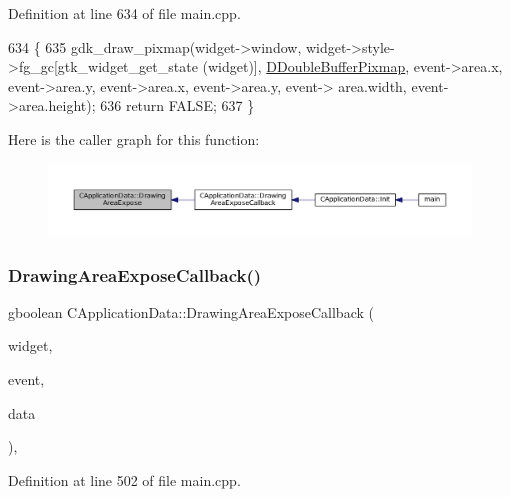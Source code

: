 Definition at line 634 of file main.\+cpp.


\begin{DoxyCode}
634                                                                                     \{
635     gdk\_draw\_pixmap(widget->window, widget->style->fg\_gc[gtk\_widget\_get\_state (widget)], 
      \hyperlink{classCApplicationData_aefb64ec5ca3f791f6d431cfc56b9f3b3}{DDoubleBufferPixmap}, event->area.x, event->area.y, event->area.x, event->area.y, event->
      area.width, event->area.height);
636     \textcolor{keywordflow}{return} FALSE;
637 \}
\end{DoxyCode}
Here is the caller graph for this function\+:
\nopagebreak
\begin{figure}[H]
\begin{center}
\leavevmode
\includegraphics[width=350pt]{classCApplicationData_ae998e896194920e08f69f321f3bc9500_icgraph}
\end{center}
\end{figure}
\hypertarget{classCApplicationData_af2ec09e61420f6c493d7ef25e4a7bd11}{}\label{classCApplicationData_af2ec09e61420f6c493d7ef25e4a7bd11} 
\subsubsection{\texorpdfstring{Drawing\+Area\+Expose\+Callback()}{DrawingAreaExposeCallback()}}
{\footnotesize\ttfamily gboolean C\+Application\+Data\+::\+Drawing\+Area\+Expose\+Callback (\begin{DoxyParamCaption}\item[{Gtk\+Widget $\ast$}]{widget,  }\item[{Gdk\+Event\+Expose $\ast$}]{event,  }\item[{gpointer}]{data }\end{DoxyParamCaption})\hspace{0.3cm}{\ttfamily [static]}, {\ttfamily [protected]}}



Definition at line 502 of file main.\+cpp.


